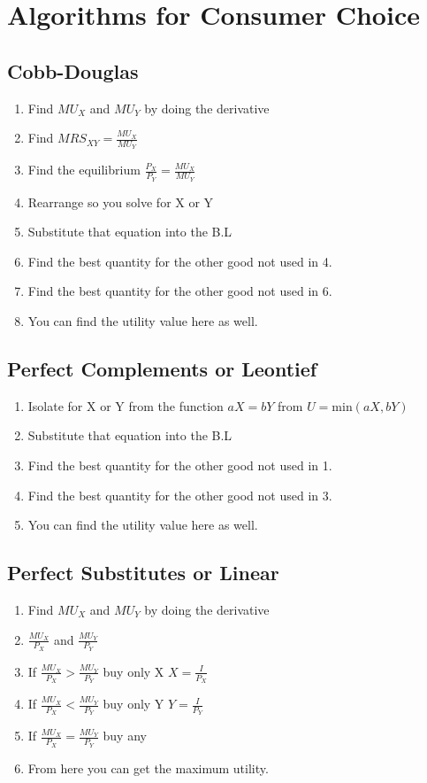 \documentclass[../ECON-281-Notes.tex]{subfiles}
\begin{document}
\section{Algorithms for Consumer Choice}
\subsection{Cobb-Douglas}
\begin{enumerate}
    \item Find \(MU_X\) and \(MU_Y\) by doing the derivative
    \item Find \(MRS_{XY} = \frac{MU_X}{MU_Y}\) 
    \item Find the equilibrium \(\frac{P_X}{P_Y} = \frac{MU_X}{MU_Y}\)
    \item Rearrange so you solve for X or Y
    \item Substitute that equation into the B.L
    \item Find the best quantity for the other good not used in 4.
    \item Find the best quantity for the other good not used in 6.
    \item You can find the utility value here as well.
\end{enumerate}

\subsection{Perfect Complements or Leontief}
\begin{enumerate}
    \item Isolate for X or Y from the function \(aX = bY\) from \(U = \text{min}(aX, bY)\)
    \item Substitute that equation into the B.L
    \item Find the best quantity for the other good not used in 1.
    \item Find the best quantity for the other good not used in 3.
    \item You can find the utility value here as well.
\end{enumerate}

\subsection{Perfect Substitutes or Linear}
\begin{enumerate}
    \item Find \(MU_X\) and \(MU_Y\) by doing the derivative
    \item \(\frac{MU_X}{P_X}\) and \(\frac{MU_Y}{P_Y}\)
    \item If \(\frac{MU_X}{P_X} > \frac{MU_Y}{P_Y}\) buy only X \(X = \frac{I}{P_X}\)
    \item If \(\frac{MU_X}{P_X} < \frac{MU_Y}{P_Y}\) buy only Y \(Y = \frac{I}{P_Y}\)
    \item If \(\frac{MU_X}{P_X} = \frac{MU_Y}{P_Y}\) buy any 
    \item From here you can get the maximum utility.
\end{enumerate}
\end{document}
